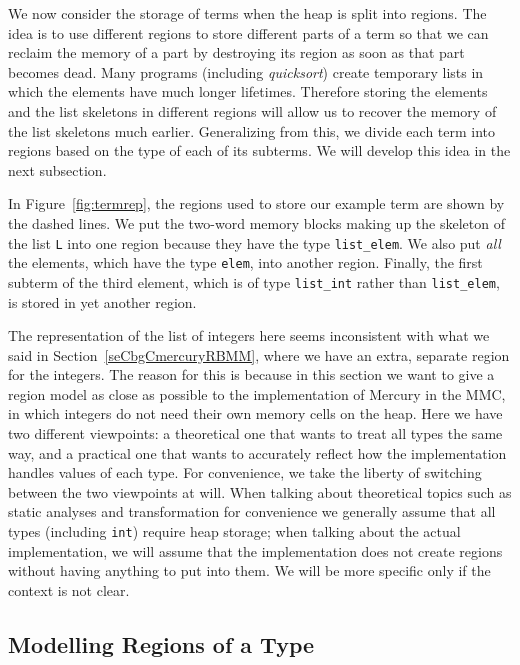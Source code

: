 \documentclass{tlp}
\newcommand{\code}[1]{{\tt#1}}
\begin{document}
We now consider the storage of terms when the heap is split into regions.
The idea is to use different regions to store different parts of a term
so that we can reclaim the memory of a part by destroying its region
as soon as that part becomes dead.
Many programs (including \emph{quicksort})
create temporary lists
in which the elements have much longer lifetimes.
Therefore storing the elements and the list skeletons in different regions
will allow us to recover the memory of the list skeletons much earlier.
Generalizing from this, we divide each term into regions
based on the type of each of its subterms.
We will develop this idea in the next subsection.

In Figure~\ref{fig:termrep},
the regions used to store our example term are shown by the dashed lines.
We put the two-word memory blocks
making up the skeleton of the list \code{L} into one region
because they have the type \code{list\_elem}.
We also put \emph{all} the elements,
which have the type \code{elem},
into another region.
Finally, the first subterm of the third element,
which is of type \code{list\_int} rather than \code{list\_elem},
is stored in yet another region.

The representation of the list of integers here
seems inconsistent with what we said in Section~\ref{seCbgCmercuryRBMM},
where we have an extra, separate region for the integers.
The reason for this is because in this section we want to give a region model
as close as possible to the implementation of Mercury in the MMC,
in which integers do not need their own memory cells on the heap.
Here we have two different viewpoints:
a theoretical one that wants to treat all types the same way,
and a practical one that wants to accurately reflect
how the implementation handles values of each type.
For convenience,
we take the liberty of switching between the two viewpoints at will.
When talking about theoretical topics
such as static analyses and transformation for convenience
we generally assume that all types (including \code{int}) require heap storage;
when talking about the actual implementation,
we will assume that the implementation does not create regions
without having anything to put into them.
We will be more specific only if the context is not clear.

\subsection{Modelling Regions of a Type}
\end{document}
